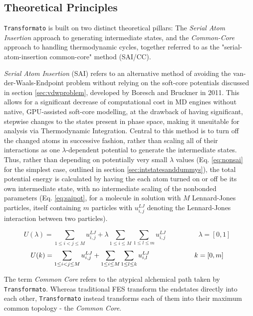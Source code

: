 \documentclass[oneside]{scrreprt}
\begin{document}
\subsection{Theoretical Principles} \label{sec:tf_principles}
\texttt{Transformato} is built on two distinct theoretical pillars: The \emph{Serial Atom Insertion} approach to generating intermediate states, and the \emph{Common-Core} approach to handling thermodynamic cycles, together referred to as the "serial-atom-insertion common-core" method (SAI/CC).

\emph{Serial Atom Insertion} (SAI)\cite{boresch_avoiding_2011} refers to an alternative method of avoiding the van-der-Waals-Endpoint problem without relying on the soft-core potentials discussed in section \ref{sec:vdwproblem}, developed by Boresch and Bruckner in 2011. This allows for a significant decrease of computational cost in MD engines without native, GPU-assisted soft-core modelling, at the drawback of having significant, stepwise changes to the states present in phase space, making it unsuitable for analysis via Thermodynamic Integration. Central to this method is to turn off the changed atoms in successive fashion, rather than scaling all of their interactions as one $\lambda$-dependent potential to generate the intermediate states. Thus, rather than depending on potentially very small $\lambda$ values (Eq. \ref{eq:nonsai} for the simplest case, outlined in section \ref{sec:intstatesanddummys}), the total potential energy is calculated by having the each atom turned on or off be its own intermediate state, with no intermediate scaling of the nonbonded parameters (Eq. \ref{eq:saipot}, for a molecule in solution with $M$ Lennard-Jones particles, itself containing $m$ particles with $u^{LJ}_{i,j}$ denoting the Lennard-Jones interaction between two particles).

\begin{equation}\label{eq:nonsai}
    U(\lambda)=\sum_{1\leq i<j \leq M} u^{LJ}_{i,j}+\lambda \sum_{1 \leq i \leq M} \sum_{1 \leq l \leq m} u^{LJ}_{i,j} \hspace{2cm} \lambda=[0,1]
\end{equation}
\begin{equation}\label{eq:saipot}
    U(k)=\sum_{1\leq i<j \leq M} u^{LJ}_{i,j}+\sum_{1 \leq i \leq M} \sum_{1 \leq l \leq k} u^{LJ}_{i,l} \hspace{2.3cm} k=[0,m]
\end{equation}

The term \emph{Common Core} \cite{Wieder2022Jun,braunsfeldImplementationTestingCHARMM} refers to the atypical alchemical path taken by \texttt{Transformato}. Whereas traditional FES transform the endstates directly into each other, \texttt{Transformato} instead transforms each of them into their maximum common topology - the \emph{Common Core}. 
\end{document}
